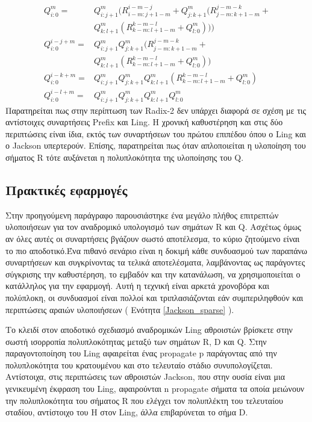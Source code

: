 \begin{equation}
    \begin{split}
        Q^m_{i:0} =& Q^m_{i:j+1}( R^{i-m-j}_{i-m:j+1-m} + Q^m_{j:k+1}( R^{j-m-k}_{j-m:k+1-m} +\\
                   & Q^m_{k:l+1}( R^{k-m-l}_{k-m:l+1-m} + Q^m_{l:0} )))\\
        Q^{i-j+m}_{i:0} =& Q^m_{i:j+1}Q^m_{j:k+1}( R^{j-m-k}_{j-m:k+1-m} +\\
                         & Q^m_{k:l+1}( R^{k-m-l}_{k-m:l+1-m} + Q^m_{l:0} ))\\
        Q^{i-k+m}_{i:0} =& Q^m_{i:j+1}Q^m_{j:k+1}Q^m_{k:l+1}( R^{k-m-l}_{k-m:l+1-m} + Q^m_{l:0} )\\
        Q^{i-l+m}_{i:0} =& Q^m_{i:j+1}Q^m_{j:k+1}Q^m_{k:l+1}Q^m_{l:0}
    \end{split}
\end{equation}
Παρατηρείται πως στην περίπτωση των Radix-2 δεν υπάρχει διαφορά σε σχέση με τις αντίστοιχες συναρτήσεις
Prefix και Ling. Η χρονική καθυστέρηση και στις δύο περιπτώσεις είναι ίδια, εκτός των συναρτήσεων του πρώτου επιπέδου όπου ο Ling και ο Jackson υπερτερούν. Επίσης, παρατηρείται πως όταν απλοποιείται η υλοποίηση του σήματος R τότε αυξάνεται η πολυπλοκότητα της υλοποίησης του Q.












\subsection{Πρακτικές εφαρμογές}
\label{subsection:Jackson_Implementations}
Στην προηγούμενη παράγραφο παρουσιάστηκε ένα μεγάλο πλήθος επιτρεπτών υλοποιήσεων για
τον αναδρομικό υπολογισμό των σημάτων R και Q. Ασχέτως όμως αν όλες αυτές οι συναρτήσεις 
βγάζουν σωστό αποτέλεσμα, το κύριο ζητούμενο είναι το πιο αποδοτικό.Ένα πιθανό σενάριο 
είναι η δοκιμή κάθε συνδυασμού των παραπάνω συναρτήσεων και συγκρίνοντας τα τελικά αποτελέσματα, 
λαμβάνοντας ως παράγοντες σύγκρισης την καθυστέρηση, το εμβαδόν και την κατανάλωση, να
χρησιμοποιείται ο κατάλληλος για την εφαρμογή. Αυτή η τεχνική είναι αρκετά χρονοβόρα 
και πολύπλοκη, οι συνδυασμοί είναι πολλοί και τριπλασιάζονται εάν συμπεριληφθούν και 
περιπτώσεις αραιών υλοποιήσεων ( Ενότητα \ref{Jackson_sparse} ).

Το κλειδί στον αποδοτικό σχεδιασμό αναδρομικών Ling αθροιστών βρίσκετε στην σωστή
ισορροπία πολυπλοκότητας μεταξύ των σημάτων R, D και Q. Στην παραγοντοποίηση του
Ling αφαιρείται ένας propagate p παράγοντας από την πολυπλοκότητα του κρατουμένου 
και στο τελευταίο στάδιο συνυπολογίζεται. Αντίστοιχα, στις περιπτώσεις των αθροιστών 
Jackson, που στην ουσία είναι μια γενικευμένη έκφραση του Ling, αφαιρούνται n propagate
σήματα τα οποία μειώνουν την πολυπλοκότητα του σήματος R που ελέγχει τον πολυπλέκτη 
του τελευταίου σταδίου, αντίστοιχο του H στον Ling, άλλα επιβαρύνεται το σήμα D. 


